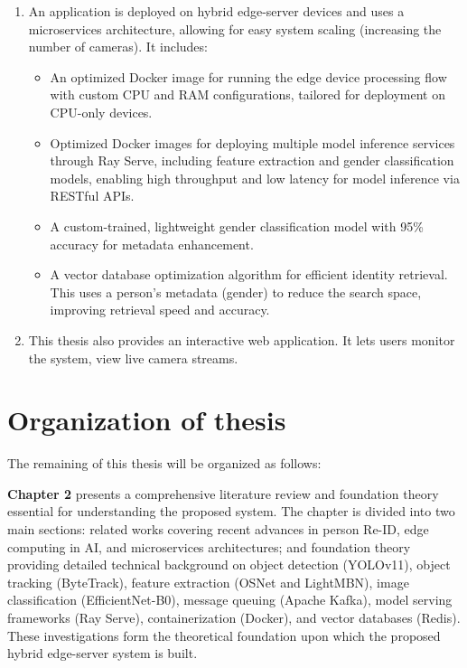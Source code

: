 \documentclass[../main.tex]{subfiles}
\begin{document}
\begin{enumerate}
    \item An application is deployed on hybrid edge-server devices and uses a microservices architecture, allowing for easy system scaling (increasing the number of cameras). It includes:
    \begin{itemize}
        \item An optimized Docker image for running the edge device processing flow with custom CPU and RAM configurations, tailored for deployment on CPU-only devices.
        \item Optimized Docker images for deploying multiple model inference services through Ray Serve, including feature extraction and gender classification models, enabling high throughput and low latency for model inference via RESTful APIs.
        \item A custom-trained, lightweight gender classification model with 95\% accuracy for metadata enhancement.
        \item A vector database optimization algorithm for efficient identity retrieval. This uses a person's metadata (gender) to reduce the search space, improving retrieval speed and accuracy.
    \end{itemize} 
\item This thesis also provides an interactive web application. It lets users monitor the system, view live camera streams.
\end{enumerate}

\section{Organization of thesis}
\label{sec:organize}

The remaining of this thesis will be organized as follows:

\textbf{Chapter 2} presents a comprehensive literature review and foundation theory essential for understanding the proposed system. The chapter is divided into two main sections: related works covering recent advances in person Re-ID, edge computing in AI, and microservices architectures; and foundation theory providing detailed technical background on object detection (YOLOv11), object tracking (ByteTrack), feature extraction (OSNet and LightMBN), image classification (EfficientNet-B0), message queuing (Apache Kafka), model serving frameworks (Ray Serve), containerization (Docker), and vector databases (Redis). These investigations form the theoretical foundation upon which the proposed hybrid edge-server system is built.
\end{document}
